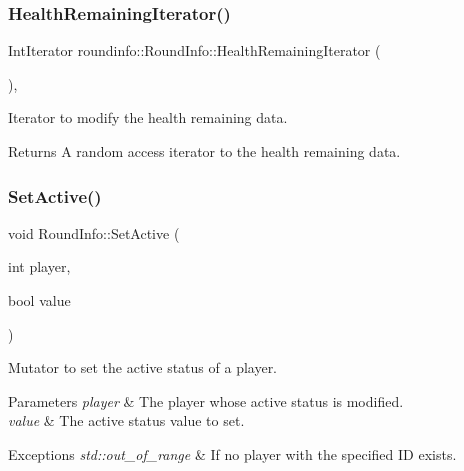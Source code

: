 \subsubsection{\texorpdfstring{Health\+Remaining\+Iterator()}{HealthRemainingIterator()}}
{\footnotesize\ttfamily Int\+Iterator roundinfo\+::\+Round\+Info\+::\+Health\+Remaining\+Iterator (\begin{DoxyParamCaption}{ }\end{DoxyParamCaption})\hspace{0.3cm}{\ttfamily [inline]}, {\ttfamily [noexcept]}}



Iterator to modify the health remaining data. 

\begin{DoxyReturn}{Returns}
A random access iterator to the health remaining data. 
\end{DoxyReturn}
\mbox{\label{classroundinfo_1_1_round_info_a28d85479753dae18a6b2a27d048d2973}} 
\subsubsection{\texorpdfstring{Set\+Active()}{SetActive()}}
{\footnotesize\ttfamily void Round\+Info\+::\+Set\+Active (\begin{DoxyParamCaption}\item[{int}]{player,  }\item[{bool}]{value }\end{DoxyParamCaption})}



Mutator to set the active status of a player. 


\begin{DoxyParams}{Parameters}
{\em player} & The player whose active status is modified. \\
\hline
{\em value} & The active status value to set. \\
\hline
\end{DoxyParams}

\begin{DoxyExceptions}{Exceptions}
{\em std\+::out\+\_\+of\+\_\+range} & If no player with the specified ID exists. \\
\hline
\end{DoxyExceptions}
\mbox{\label{classroundinfo_1_1_round_info_a9d5ae58298d3acd11377da7992235762}} 
